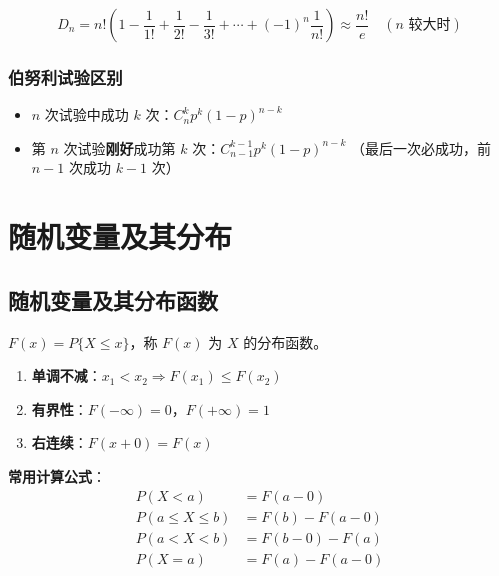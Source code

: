 \documentclass[12pt, a4paper]{article}
\begin{document}
\[
    D_n = n!\left(1 - \frac{1}{1!} + \frac{1}{2!} - \frac{1}{3!} + \cdots
    + (-1)^n\frac{1}{n!}\right) \approx \frac{n!}{e}\quad (n\text{ 较大时})
\]

\subsubsection{伯努利试验区别}

\begin{itemize}
    \item $n$ 次试验中成功 $k$ 次：$C_n^k p^k (1-p)^{n-k}$
    \item 第 $n$ 次试验\textbf{刚好}成功第 $k$ 次：$C_{n-1}^{k-1} p^k (1-p)^{n-k}$
          （最后一次必成功，前 $n-1$ 次成功 $k-1$ 次）
\end{itemize}

\section{随机变量及其分布}

\subsection{随机变量及其分布函数}

\begin{tcolorbox}[defbox, title={分布函数}]
    $F(x) = P\{X \le x\}$，称 $F(x)$ 为 $X$ 的分布函数。
\end{tcolorbox}

\begin{tcolorbox}[thmbox, title={分布函数的性质（充要条件）}]
    \begin{enumerate}
        \item \textbf{单调不减}：$x_1<x_2 \Rightarrow F(x_1)\le F(x_2)$
        \item \textbf{有界性}：$F(-\infty)=0$，$F(+\infty)=1$
        \item \textbf{右连续}：$F(x+0)=F(x)$
    \end{enumerate}
    \textbf{常用计算公式}：
    \begin{align*}
        P(X < a)         & = F(a-0)        \\
        P(a \le X \le b) & = F(b) - F(a-0) \\
        P(a < X < b)     & = F(b-0) - F(a) \\
        P(X = a)         & = F(a) - F(a-0)
    \end{align*}
\end{tcolorbox}
\end{document}

